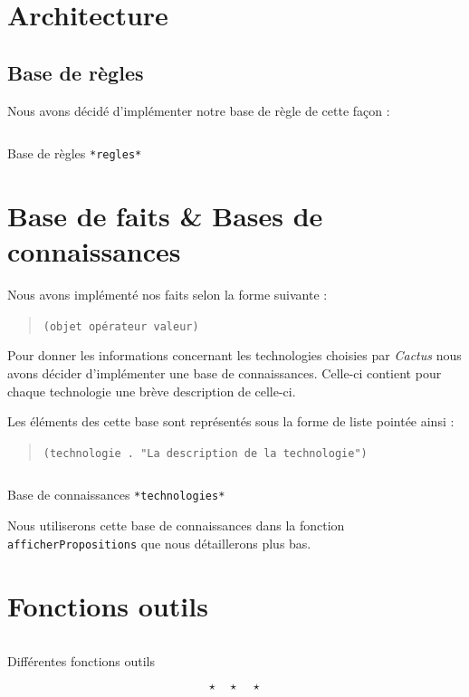 \documentclass[a4paper,12pt]{article}
\begin{document}
\section{Architecture}

\subsection{Base de règles}
Nous avons décidé d'implémenter notre base de règle de cette façon : 

\begin{listing}[H]
	\centering
	\inputminted[breaklines=true]{lisp}{../regles.lisp}
	\caption{Base de règles \texttt{*regles*}}
\end{listing}

\section{Base de faits \& Bases de connaissances}

Nous avons implémenté nos faits selon la forme suivante :

\begin{quotation}
	\texttt{(objet opérateur valeur)}
\end{quotation}

Pour donner les informations concernant les technologies choisies par \textit{Cactus} nous avons décider d'implémenter une base de connaissances. Celle-ci contient pour chaque technologie une brève description de celle-ci.

Les éléments des cette base sont représentés sous la forme de liste pointée ainsi :

\begin{quotation}
	\texttt{(technologie . "La description de la technologie")}
\end{quotation}

\begin{listing}[H]
	\centering
	\inputminted[breaklines=true]{lisp}{../technologies.lisp}
	\caption{Base de connaissances \texttt{*technologies*}}
\end{listing}

Nous utiliserons cette base de connaissances dans la fonction \texttt{afficherPropositions} que nous détaillerons plus bas.

\section{Fonctions outils}

\begin{listing}[H]
	\centering
	\inputminted[breaklines=true]{lisp}{../fonctionsOutils.lisp}
	\caption{Différentes fonctions outils}
\end{listing}
\[ \star \quad \star \quad \star \]

\newpage
%
\end{document}
